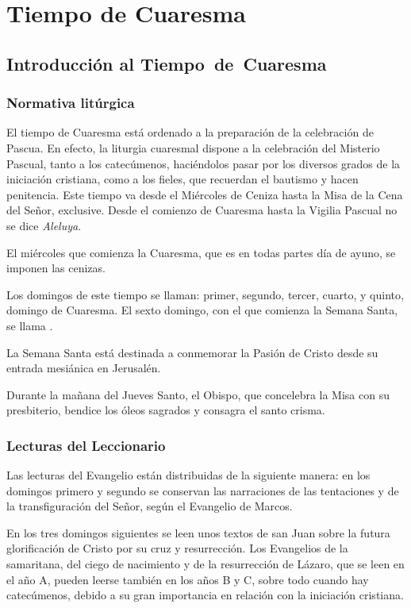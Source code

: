 \part{Tiempo de Cuaresma}
\chapter{Introducción al Tiempo~de~Cuaresma}
\begin{introstyle}
\section{Normativa litúrgica}
El tiempo de Cuaresma está ordenado a la preparación de la celebración de Pascua. En efecto, la liturgia cuaresmal dispone a la celebración del Misterio Pascual, tanto a los catecúmenos, haciéndolos pasar por los diversos grados de la iniciación cristiana, como a los fieles, que recuerdan el bautismo y hacen penitencia. Este tiempo va desde el Miércoles de Ceniza hasta la Misa de la Cena del Señor, exclusive. Desde el comienzo de Cuaresma hasta la Vigilia Pascual no se dice \textit{Aleluya}.

El miércoles que comienza la Cuaresma, que es en todas partes día de ayuno, se imponen las cenizas.

Los domingos de este tiempo se llaman: primer, segundo, tercer, cuarto, y quinto, domingo de Cuaresma. El sexto domingo, con el que comienza la Semana Santa, se llama .

La Semana Santa está destinada a conmemorar la Pasión de Cristo desde su entrada mesiánica en Jerusalén. 

Durante la mañana del Jueves Santo, el Obispo, que concelebra la Misa con su presbiterio, bendice los óleos sagrados y consagra el santo crisma.

\newpage
\section{Lecturas del Leccionario}

Las lecturas del Evangelio están distribuidas de la siguiente manera: en los domingos primero y segundo se conservan las narraciones de las tentaciones y de la transfiguración del Señor, según el Evangelio de Marcos. 

En los tres domingos siguientes se leen unos textos de san Juan sobre la futura glorificación de Cristo por su cruz y resurrección. Los Evangelios de la samaritana, del ciego de nacimiento y de la resurrección de Lázaro, que se leen en el año A, pueden leerse también en los años B y C, sobre todo cuando hay catecúmenos, debido a su gran importancia en relación con la iniciación cristiana.


\end{introstyle}
